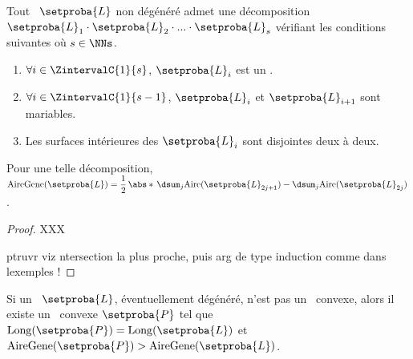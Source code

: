 \newpage

\begin{fact} \label{ngone-trick}
    Tout \ncycle\ $\setproba{L}$ non dégénéré admet une décomposition
    $\setproba{L}_1 \cdot \setproba{L}_2 \cdot ... \cdot \setproba{L}_s$ 
    vérifiant les conditions suivantes où $s \in \NNs$.
    \begin{enumerate}
    	\item $\forall i \in \ZintervalC{1}{s}$, $\setproba{L}_i$ est un .
	
    	\item $\forall i \in \ZintervalC{1}{s-1}$, $\setproba{L}_i$ et $\setproba{L}_{i+1}$ sont mariables.

    	\item Les surfaces intérieures des  $\setproba{L}_i$ sont disjointes deux à deux.
    \end{enumerate}
    
    Pour une telle décomposition, 
    $ \garea{\setproba{L}} 
    = \dfrac12 \, \abs*{\,
    	\dsum_{j} \area{\setproba{L}_{2j + 1}}  -  \dsum_{j} \area{\setproba{L}_{2j}}
	  \,}$.
\end{fact}


\begin{proof}
    XXX
    
    ptruvr viz ntersection la plus proche, puis arg de type induction comme dans lexemples !
\end{proof}






\begin{fact} \label{no-cross-max}
    Si un \ncycle\ $\setproba{L}$, éventuellement dégénéré, n'est pas un \ngone\ convexe, alors il existe un \ngone\ convexe $\setproba{P}$ tel que
	$\perim{\setproba{P}} = \perim{\setproba{L}}$
	et
	$\garea{\setproba{P}} > \garea{\setproba{L}}$.
\end{fact}


